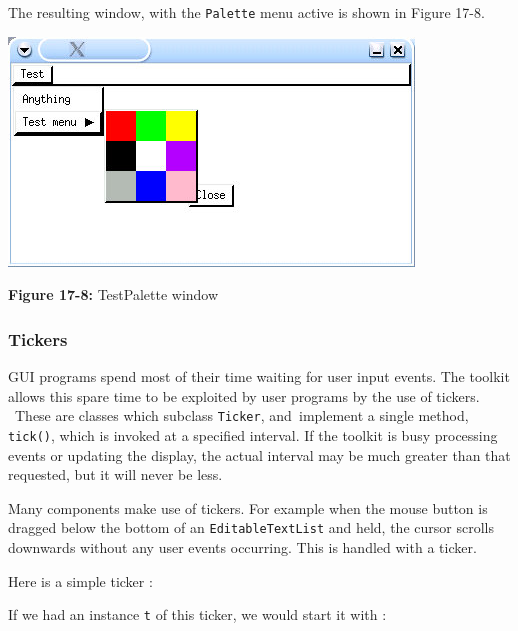 The resulting window, with the \texttt{Palette} menu active is shown in
Figure 17-8.

\begin{center}
\includegraphics[width=4.2398in,height=2.3953in]{ub-img/ub-img57.jpg}
\end{center}

{\sffamily\bfseries Figure 17-8:}
{\sffamily TestPalette window}

\subsubsection{Tickers}

GUI programs spend most of their time waiting for user input
events. The toolkit allows this spare time to be exploited by user
programs by the use of {\textquotedbl}tickers{\textquotedbl}. \ These
are classes which subclass \texttt{Ticker}, and\texttt{ }implement a
single method, \texttt{tick()}, which is invoked at a specified
interval. If the toolkit is busy processing events or
updating the display, the actual interval may be much greater than that
requested, but it will never be less.

Many components make use of tickers. For example when the mouse button
is dragged below the bottom of an \texttt{EditableTextList} and held,
the cursor scrolls downwards without any user events occurring. This
is handled with a ticker.

Here is a simple ticker :


If we had an instance \texttt{t} of this ticker, we would start it with
:

